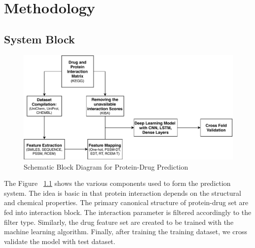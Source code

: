 \usetikzlibrary{arrows,automata}
\chapter{Methodology}

\section{System Block}



\begin{figure}[ht]
  \includegraphics[width=1\linewidth]{mainmatter/3-Methodology/images/block.pdf}
  \caption{Schematic Block Diagram for Protein-Drug Prediction}
  \label{fig:system}
\end{figure}

The Figure ~\ref{fig:system} shows the various components used to form the prediction system. The idea is basic in that protein interaction depends on the structural and chemical properties. The primary canonical structure of protein-drug set are fed into interaction block. The interaction parameter is filtered accordingly to the filter type. Similarly, the drug feature set are created to be trained with the machine learning algorithm. Finally, after training the training dataset, we cross validate the model with test dataset.


